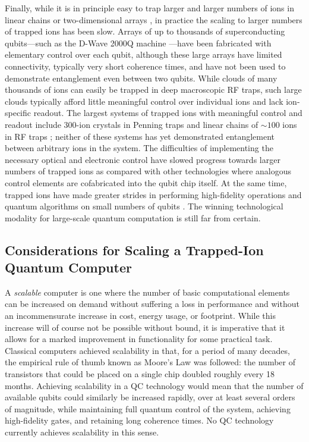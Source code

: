 \documentclass[%
reprint,
 amsmath,amssymb,
]{revtex4-1}
\begin{document}
Finally, while it is in principle easy to trap larger and larger numbers of ions in linear chains \cite{PaganoCryoChains2018} or two-dimensional arrays \cite{BruzewiczArrayLoading2016}, in practice the scaling to larger numbers of trapped ions has been slow. Arrays of up to thousands of superconducting qubits---such as the D-Wave 2000Q machine \cite{DWave}---have been fabricated with elementary control over each qubit, although these large arrays have limited connectivity, typically very short coherence times, and have not been used to demonstrate entanglement even between two qubits. While clouds of many thousands of ions can easily be trapped in deep macroscopic RF traps, such large clouds typically afford little meaningful control over individual ions and lack ion-specific readout. The largest systems of trapped ions with meaningful control and readout include 300-ion crystals in Penning traps \cite{BohnetSpinDynamics2016} and linear chains of ${\sim}100$ ions in RF traps \cite{PaganoCryoChains2018}; neither of these systems has yet demonstrated entanglement between arbitrary ions in the system. The difficulties of implementing the necessary optical and electronic control have slowed progress towards larger numbers of trapped ions as compared with other technologies where analogous control elements are cofabricated into the qubit chip itself. At the same time, trapped ions have made greater strides in performing high-fidelity operations \cite{HartyHighFidelityIons2014, Ballance2QubitHyperfineGate2016} and quantum algorithms on small numbers of qubits \cite{LanyonDigSim2011, LinkeArchCompare2017}. The winning technological modality for large-scale quantum computation is still far from certain.

\subsection{Considerations for Scaling a Trapped-Ion Quantum Computer}
\label{Sec:Practical}


A \emph{scalable} computer is one where the number of basic computational elements can be increased on demand without suffering a loss in performance and without an incommensurate increase in cost, energy usage, or footprint. While this increase will of course not be possible without bound, it is imperative that it allows for a marked improvement in functionality for some practical task.  Classical computers achieved scalability in that, for a period of many decades, the empirical rule of thumb known as Moore's Law was followed: the number of transistors that could be placed on a single chip doubled roughly every 18 months. Achieving scalability in a QC technology would mean that the number of available qubits could similarly be increased rapidly, over at least several orders of magnitude, while maintaining full quantum control of the system, achieving high-fidelity gates, and retaining long coherence times. No QC technology currently achieves scalability in this sense.
\end{document}
